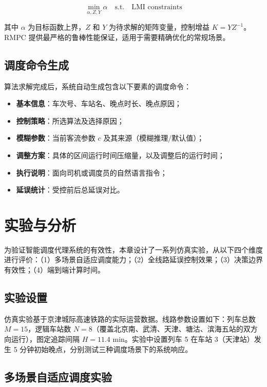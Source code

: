 \begin{equation}
    \min_{\alpha, Z, Y} \alpha \quad \text{s.t.} \quad \text{LMI constraints}
    \label{eq:rmpc_lmi}
\end{equation}

其中 $\alpha$ 为目标函数上界，$Z$ 和 $Y$ 为待求解的矩阵变量，控制增益 $K = Y Z^{-1}$。RMPC 提供最严格的鲁棒性能保证，适用于需要精确优化的常规场景。

\subsection{调度命令生成}

算法求解完成后，系统自动生成包含以下要素的调度命令：

\begin{itemize}
    \item \textbf{基本信息}：车次号、车站名、晚点时长、晚点原因；
    \item \textbf{控制策略}：所选算法及选择原因；
    \item \textbf{模糊参数}：当前客流参数 $c$ 及其来源（模糊推理/默认值）；
    \item \textbf{调整方案}：具体的区间运行时间压缩量，以及调整后的运行时间；
    \item \textbf{执行说明}：面向司机或调度员的自然语言指令；
    \item \textbf{延误统计}：受控前后总延误对比。
\end{itemize}

\section{实验与分析}
\label{agent:sec6}

为验证智能调度代理系统的有效性，本章设计了一系列仿真实验，从以下四个维度进行评价：（1）多场景自适应调度能力；（2）全线路延误控制效果；（3）决策边界有效性；（4）端到端计算时间。

\subsection{实验设置}

仿真实验基于京津城际高速铁路的实际运营数据。线路参数设置如下：列车总数 $M = 15$，逻辑车站数 $N = 8$（覆盖北京南、武清、天津、塘沽、滨海五站的双方向运行），图定追踪间隔 $H = 11.4$ min。实验中设置列车 5 在车站 3（天津站）发生 5 分钟初始晚点，分别测试三种调度场景下的系统响应。

\subsection{多场景自适应调度实验}

